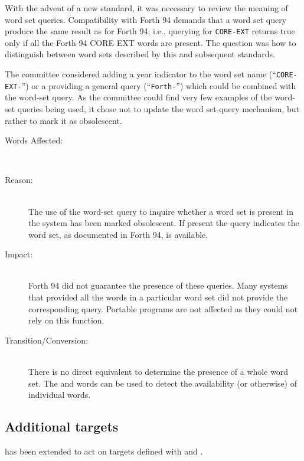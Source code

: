 With the advent of a new standard, it was necessary to review the
meaning of word set queries.  Compatibility with Forth 94 demands
that a word set query produce the same result as for Forth 94; i.e.,
querying for \texttt{CORE-EXT} returns true only if all the Forth 94
CORE EXT words are present.  The question was how to distinguish
between word sets described by this and subsequent standards.

The committee considered adding a year indicator to the word set name
(``\texttt{CORE-EXT-\snapshot}'') or a providing a general query
(``\texttt{Forth-\snapshot}'') which could be combined with the
word-set query.  As the committee could find very few examples of the
word-set queries being used, it chose not to update the word set-query
mechanism, but rather to mark it as obsolescent.

\begin{description}
\item[Words Affected:] ~\\

\item[Reason:] ~\\
	The use of the word-set query to inquire whether a word set is
	present in the system has been marked obsolescent.  If present
	the query indicates the word set, as documented in Forth 94, is
	available.

\item[Impact:] ~\\
	Forth 94 did not guarantee the presence of these queries.  Many
	systems that provided all the words in a particular word set did
	not provide the corresponding query.  Portable programs are not
	affected as they could not rely on this function.

\item[Transition/Conversion:] ~\\
	There is no direct equivalent to determine the presence of a whole
	word set.  The  and 
	words can be used to detect the availability (or otherwise) of
	individual words.
\end{description}


\subsection[Additional TO targets]{Additional  targets} %
\label{diff:12:to}

 has been extended to act on targets defined with
 and .

